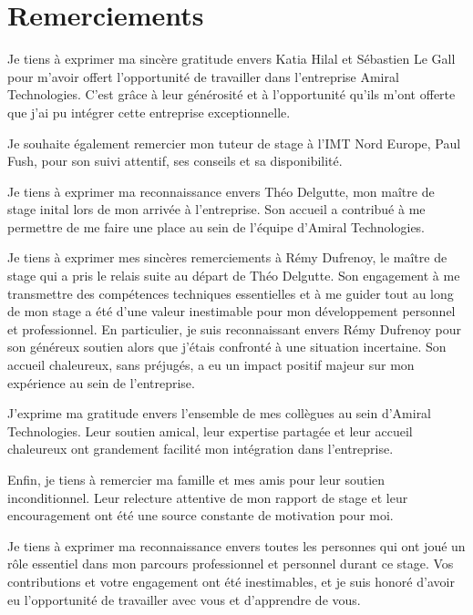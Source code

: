 \section*{Remerciements}
Je tiens à exprimer ma sincère gratitude envers Katia Hilal et Sébastien Le Gall pour m'avoir offert l'opportunité de travailler dans l'entreprise Amiral Technologies.
C'est grâce à leur générosité et à l'opportunité qu'ils m'ont offerte que j'ai pu intégrer cette entreprise exceptionnelle.

Je souhaite également remercier mon tuteur de stage à l'IMT Nord Europe, Paul Fush, pour son suivi attentif, ses conseils et sa disponibilité.

Je tiens à exprimer ma reconnaissance envers Théo Delgutte, mon maître de stage inital lors de mon arrivée à l'entreprise.
Son accueil a contribué à me permettre de me faire une place au sein de l'équipe d'Amiral Technologies.

Je tiens à exprimer mes sincères remerciements à Rémy Dufrenoy, le maître de stage qui a pris le relais suite au départ de Théo Delgutte.
Son engagement à me transmettre des compétences techniques essentielles et à me guider tout au long de mon stage a été d'une valeur inestimable pour mon développement personnel et professionnel.
En particulier, je suis reconnaissant envers Rémy Dufrenoy pour son généreux soutien alors que j'étais confronté à une situation incertaine.
Son accueil chaleureux, sans préjugés, a eu un impact positif majeur sur mon expérience au sein de l'entreprise.

J'exprime ma gratitude envers l'ensemble de mes collègues au sein d'Amiral Technologies.
Leur soutien amical, leur expertise partagée et leur accueil chaleureux ont grandement facilité mon intégration dans l'entreprise.

Enfin, je tiens à remercier ma famille et mes amis pour leur soutien inconditionnel.
Leur relecture attentive de mon rapport de stage et leur encouragement ont été une source constante de motivation pour moi.

Je tiens à exprimer ma reconnaissance envers toutes les personnes qui ont joué un rôle essentiel dans mon parcours professionnel et personnel durant ce stage.
Vos contributions et votre engagement ont été inestimables, et je suis honoré d'avoir eu l'opportunité de travailler avec vous et d'apprendre de vous.
\clearpage